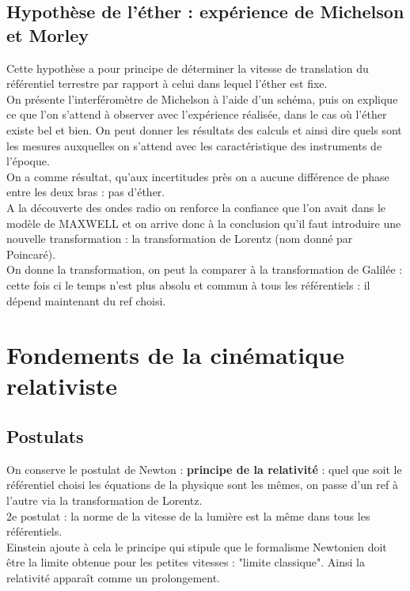 \documentclass[12pt,prb,aps,epsf]{article}
\begin{document}
\subsection{Hypothèse de l'éther : expérience de Michelson et Morley}
Cette hypothèse a pour principe de déterminer la vitesse de translation du référentiel terrestre par rapport à celui dans lequel l'éther est fixe.\\

On présente l'interféromètre de Michelson à l'aide d'un schéma, puis on explique ce que l'on s'attend à observer avec l'expérience réalisée, dans le cas où l'éther existe bel et bien. On peut donner les résultats des calculs et ainsi dire quels sont les mesures auxquelles on s'attend avec les caractéristique des instruments de l'époque.\\

On a comme résultat, qu'aux incertitudes près on a aucune différence de phase entre les deux bras : pas d'éther.\\

A la découverte des ondes radio on renforce la confiance que l'on avait dans le modèle de MAXWELL et on arrive donc à la conclusion qu'il faut introduire une nouvelle transformation : la transformation de Lorentz (nom donné par Poincaré).\\

On donne la transformation, on peut la comparer à la transformation de Galilée : cette fois ci le temps n'est plus absolu et commun à tous les référentiels : il dépend maintenant du ref choisi.

 \section{Fondements de la cinématique relativiste}
 \subsection{Postulats}
 On conserve le postulat de Newton : \textbf{principe de la relativité} : quel que soit le référentiel choisi les équations de la physique sont les mêmes, on passe d'un ref à l'autre via la transformation de Lorentz.\\
 
 2e postulat : la norme de la vitesse de la lumière est la même dans tous les référentiels.\\
 
 Einstein ajoute à cela le principe qui stipule que le formalisme Newtonien doit être la limite obtenue pour les petites vitesses : "limite classique". Ainsi la relativité apparaît comme un prolongement.
 
\end{document}
